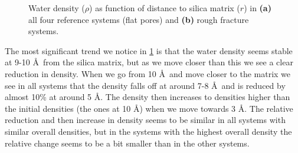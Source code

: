 \begin{figure}[!htb]%
    \setlength{\myfigwidth}{0.58\textwidth}%
    \vspace{8pt}%
    \caption{%
        Water density ($\rho$) as function of distance to silica matrix ($r$) in \textbf{(a)} all four reference systems (flat pores) and \textbf{(b)} rough fracture systems.%
        \label{fig:first_density_fig}%
    }%
\end{figure}%

The most significant trend we notice in \cref{fig:first_density_fig} is that the water density seems stable at 9-10 \AA\ from the silica matrix, but as we move closer than this we see a clear reduction in density. When we go from 10 \AA\ and move closer to the matrix we see in all systems that the density falls off at around 7-8 \AA\, and is reduced by almost 10\% at around 5 \AA. The density then increases to densities higher than the initial densities (the ones at 10 \AA) when we move towards 3 \AA. The relative reduction and then increase in density seems to be similar in all systems with similar overall densities, but in the systems with the highest overall density the relative change seems to be a bit smaller than in the other systems.

